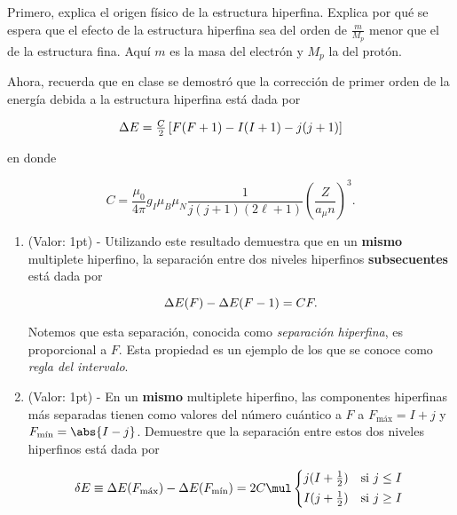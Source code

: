 \documentclass[./../main.tex]{subfiles}
\begin{document}
    \begin{exercise}
        Primero, explica el origen físico de la estructura hiperfina. Explica por qué se espera que el efecto de la estructura hiperfina sea del orden de \(\tfrac{m}{M_{p}}\) menor que el de la estructura fina. Aquí \(m\) es la masa del electrón y \(M_{p}\) la del protón.
        
        Ahora, recuerda que en clase se demostró que la corrección de primer orden de la energía debida a la estructura hiperfina está dada por

        \begin{equation*}
            \change{E} = \tfrac{C}{2}\left[F(F + 1) - I(I + 1) - j(j + 1)\right]
        \end{equation*}

        en donde

        \begin{equation*}
            C = \dfrac{\mu_{0}}{4\pi}g_{I}\mu_{B}\mu_{N}\dfrac{1}{j(j + 1)(2\ell + 1)}\left(\dfrac{Z}{a_{\mu}n}\right)^{3}.
        \end{equation*}

        \begin{enumerate}
            \item (Valor: 1pt) - Utilizando este resultado demuestra que en un \textbf{mismo} multiplete hiperfino, la separación entre dos niveles hiperfinos \textbf{subsecuentes} está dada por
            
            \begin{equation*}
                \change{E}(F) - \change{E}(F - 1) = CF.
            \end{equation*}

            Notemos que esta separación, conocida como \emph{separación hiperfina}, es proporcional a \(F\). Esta propiedad es un ejemplo de los que se conoce como \emph{regla del intervalo}.

            \item (Valor: 1pt) - En un \textbf{mismo} multiplete hiperfino, las componentes hiperfinas más separadas tienen como valores del número cuántico a \(F\) a \(F_{\text{máx}} = I + j\) y \(F_{\text{mín}} = \abs{I - j}\). Demuestre que la separación entre estos dos niveles hiperfinos está dada por
            
            \begin{equation*}
                \fdif{E} \equiv \adif{E}(F_{\text{máx}}) - \adif{E}(F_{\text{mín}}) = 2C \mul \begin{dcases*}
                    j(I + \tfrac{1}{2}) & si \(j \leq I\)\\
                    I(j + \tfrac{1}{2}) & si \(j \geq I\)
                \end{dcases*} 
            \end{equation*}
            

\end{enumerate}
\end{exercise}
\end{document}

